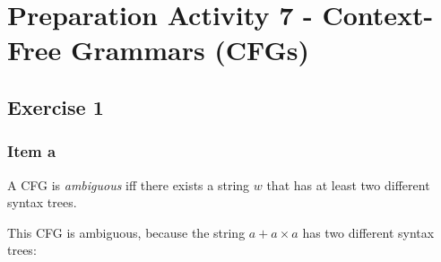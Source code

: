 \setcounter{section}{6}
\section{Preparation Activity 7 - Context-Free Grammars (CFGs)}
{
\renewcommand{\thesubsubsection}{\thesubsection\alph{subsubsection}}
\newcommand{\lmd}{\xRightarrow[lm]{}}
\subsection{Exercise 1}
\subsubsection{Item a}
\begin{definition}
A CFG is \textit{ambiguous} iff there exists a string $w$ that has at least two different syntax trees.
\end{definition}
This CFG is ambiguous, because the string $a+a \times a$ has two different syntax trees:
\begin{center}
\begin{minipage}{0.4\linewidth}
	\begin{center}
	\end{center}
\end{minipage}
\begin{minipage}{0.4\linewidth}
	\begin{center}
	\end{center}
\end{minipage}
\end{center}
}
